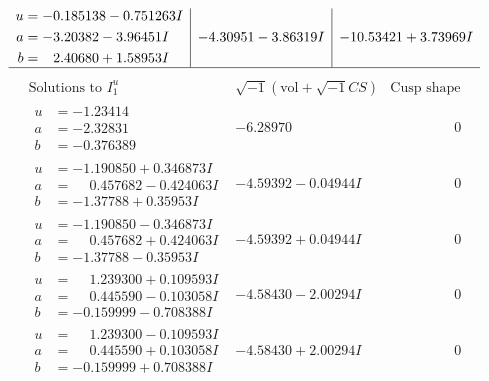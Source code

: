 \documentclass[1p]{elsarticle_modified}
\theoremstyle{definition}
\newcommand{\I}{\sqrt{-1}}
\begin{document}
$$\begin{array}{c|c|c}
\begin{aligned}
u &= -0.185138 - 0.751263 I \\
a &= -3.20382 - 3.96451 I \\
b &= \phantom{-}2.40680 + 1.58953 I\end{aligned}
 & -4.30951 - 3.86319 I & -10.53421 + 3.73969 I\\
 \hline 
 \end{array}$$\newpage$$\begin{array}{c|c|c}  
\text{Solutions to }I^u_{1}& \I (\text{vol} + \sqrt{-1}CS) & \text{Cusp shape}\\
 \hline 
\begin{aligned}
u &= -1.23414\phantom{ +0.000000I} \\
a &= -2.32831\phantom{ +0.000000I} \\
b &= -0.376389\phantom{ +0.000000I}\end{aligned}
 & -6.28970\phantom{ +0.000000I} & \phantom{-0.000000 } 0 \\ \hline\begin{aligned}
u &= -1.190850 + 0.346873 I \\
a &= \phantom{-}0.457682 - 0.424063 I \\
b &= -1.37788 + 0.35953 I\end{aligned}
 & -4.59392 - 0.04944 I & \phantom{-0.000000 } 0 \\ \hline\begin{aligned}
u &= -1.190850 - 0.346873 I \\
a &= \phantom{-}0.457682 + 0.424063 I \\
b &= -1.37788 - 0.35953 I\end{aligned}
 & -4.59392 + 0.04944 I & \phantom{-0.000000 } 0 \\ \hline\begin{aligned}
u &= \phantom{-}1.239300 + 0.109593 I \\
a &= \phantom{-}0.445590 - 0.103058 I \\
b &= -0.159999 - 0.708388 I\end{aligned}
 & -4.58430 - 2.00294 I & \phantom{-0.000000 } 0 \\ \hline\begin{aligned}
u &= \phantom{-}1.239300 - 0.109593 I \\
a &= \phantom{-}0.445590 + 0.103058 I \\
b &= -0.159999 + 0.708388 I\end{aligned}
 & -4.58430 + 2.00294 I & \phantom{-0.000000 } 0 \\ \hline\begin{aligned}

\end{aligned}
\end{array}$$
\end{document}
